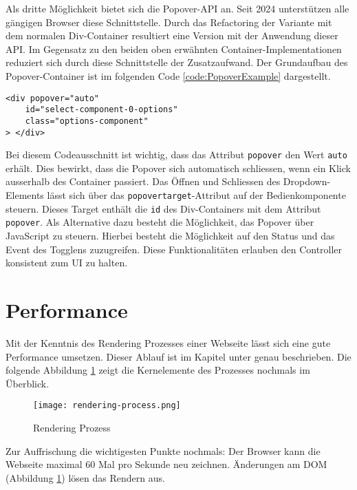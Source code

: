 Als dritte Möglichkeit bietet sich die Popover-API an. 
Seit 2024 unterstützen alle gängigen Browser diese Schnittstelle.
Durch das Refactoring der Variante mit dem normalen Div-Container resultiert eine Version mit der Anwendung dieser API. 
Im Gegensatz zu den beiden oben erwähnten Container-Implementationen reduziert sich durch diese Schnittstelle der Zusatzaufwand. 
Der Grundaufbau des Popover-Container ist im folgenden Code \ref{code:PopoverExample} dargestellt. 

\begin{lstlisting}[style = htmlcssjs, caption = Popover-Container Beispiel, label = code:PopoverExample]
<div popover="auto"
    id="select-component-0-options" 
    class="options-component" 
> </div>
\end{lstlisting}

Bei diesem Codeausschnitt ist wichtig, dass das Attribut \texttt{popover} den Wert \texttt{auto} erhält.
Dies bewirkt, dass die Popover sich automatisch schliessen, wenn ein Klick ausserhalb des Container passiert.
Das Öffnen und Schliessen des Dropdown-Elements lässt sich über das \texttt{popovertarget}-Attribut auf der Bedienkomponente steuern.
Dieses Target enthält die \texttt{id} des Div-Containers mit dem Attribut \texttt{popover}. 
Als Alternative dazu besteht die Möglichkeit, das Popover über JavaScript zu steuern.
Hierbei besteht die Möglichkeit auf den Status und das Event des Togglens zuzugreifen.
Diese Funktionalitäten erlauben den Controller konsistent zum UI zu halten.


\section{Performance}
\label{sec:performance}

Mit der Kenntnis des Rendering Prozesses einer Webseite lässt sich eine gute Performance umsetzen. 
Dieser Ablauf ist im Kapitel \textbf{} unter \textbf{} genau beschrieben.
Die folgende Abbildung \ref{img:RenderingProcessRecap} zeigt die Kernelemente des Prozesses nochmals im Überblick.

\begin{figure}[!htb]
    \centering
    \texttt{[image: rendering-process.png]}
    \caption{Rendering Prozess}
    \label{img:RenderingProcessRecap}
\end{figure}

Zur Auffrischung die wichtigesten Punkte nochmals: 
Der Browser kann die Webseite maximal 60 Mal pro Sekunde neu zeichnen.
Änderungen am DOM (Abbildung \ref{img:RenderingProcessRecap}) lösen das Rendern aus. 

